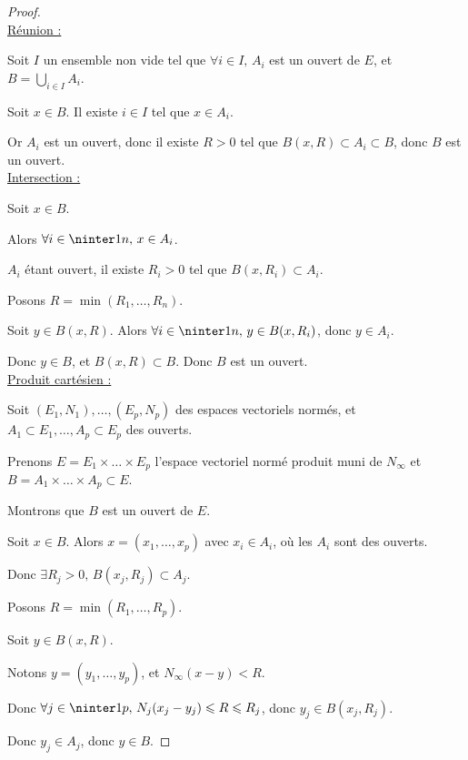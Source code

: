 \begin{proof}~\\
    \uline{Réunion :}

    \svspace Soit $I$ un ensemble non vide tel que $\forall i \in I, \, A_i$ est un ouvert de $E$, et 
    $\displaystyle B = \bigcup_{i \in I} A_i$.

    Soit $x \in B$. Il existe $i \in I$ tel que $x \in A_i$.

    Or $A_i$ est un ouvert, donc il existe $R > 0$ tel que $B(x, R) \subset A_i \subset B$, 
    donc $B$ est un ouvert. \\

    \uline{Intersection :}

    \svspace Soit $x \in B$. 

    Alors $\forall i \in \ninter 1 n, \, x \in A_i$. 

    $A_i$ étant ouvert, il existe $R_i > 0$ tel que $B(x, R_i) \subset A_i$.

    Posons $R = \min(R_1, \dots, R_n)$.

    Soit $y \in B(x, R)$. Alors $\forall i \in \ninter 1 n, \, y \in B(x, R_i)$, donc $y \in A_i$.

    Donc $y \in B$, et $B(x, R) \subset B$. Donc $B$ est un ouvert. \\

    \uline{Produit cartésien :}

    \svspace Soit $(E_1, N_1), \dots, (E_p, N_p)$ des espaces vectoriels normés, et 
    $A_1 \subset E_1, \dots, A_p \subset E_p$ des ouverts.

    Prenons $E = E_1 \times \dots \times E_p$ l'espace vectoriel normé produit muni de $N_\infty$
    et $B = A_1 \times \dots \times A_p \subset E$.

    Montrons que $B$ est un ouvert de $E$.

    Soit $x \in B$. Alors $x = (x_1, \dots, x_p)$ avec $x_i \in A_i$, où les $A_i$ sont des ouverts.

    Donc $\exists R_j > 0, \, B(x_j, R_j) \subset A_j$.

    Posons $R = \min(R_1, \dots, R_p)$.

    Soit $y \in B(x, R)$. 

    Notons $y = (y_1, \dots, y_p)$, et $N_\infty(x - y) < R$.

    Donc $\forall j \in \ninter 1 p, \, N_j(x_j - y_j) \leqslant R \leqslant R_j$, donc $y_j \in B(x_j, R_j)$.

    Donc $y_j \in A_j$, donc $y \in B$.
\end{proof}

